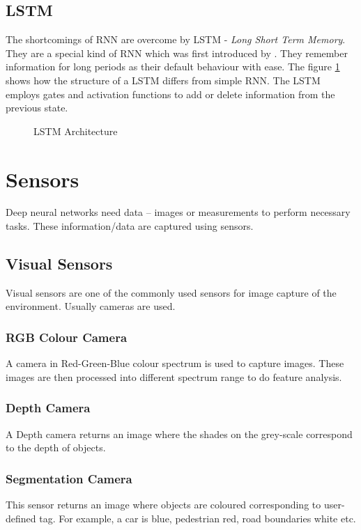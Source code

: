 \subsection{LSTM}
\label{subsubsec:lstm}
The shortcomings of RNN are overcome by LSTM - \textit{Long Short Term Memory}.
They are a special kind of RNN which was first introduced by \cite{LSTMPaper}. They remember
information for long periods as their default behaviour with ease. The figure
\ref{fig:lstm} shows how the structure of a LSTM differs from simple RNN. The LSTM employs
gates and activation functions to add or delete information from the previous state.

\begin{figure}[h]
	\begin{center}
	   \def\svgwidth{0.7\columnwidth}
%    
	\end{center}
    \caption{LSTM Architecture}
    \label{fig:lstm}
\end{figure}


\section{Sensors}
Deep neural networks need data -- images or measurements to perform necessary tasks. These
information/data are captured using sensors.
\subsection{Visual Sensors}
Visual sensors are one of the commonly used sensors for image capture of the environment.
Usually cameras are used.
\subsubsection*{RGB Colour Camera}
A camera in Red-Green-Blue colour spectrum is used to capture images. These images are
then processed into different spectrum range to do feature analysis.
\subsubsection*{Depth Camera}
A Depth camera returns an image where the shades on the grey-scale correspond to the depth of objects.
\subsubsection*{Segmentation Camera}
This sensor returns an image where objects are coloured corresponding to user-defined tag.
For example, a car is blue, pedestrian red, road boundaries white etc.
